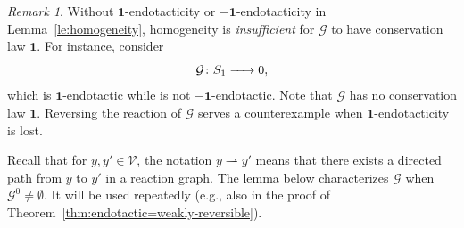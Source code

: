 \documentclass[10pt]{amsart}
\numberwithin{equation}{section}
\theoremstyle{plain}
\theoremstyle{definition}
\theoremstyle{remark}
\newtheorem{remark}[theorem]{Remark}
\newcommand{\cG}{\mathcal{G}}
\newcommand{\cV}{\mathcal{V}}
\begin{document}
\begin{remark}
 Without $\mathbf{1}$-endotacticity or $-\mathbf{1}$-endotacticity in Lemma~\ref{le:homogeneity}, homogeneity is \emph{insufficient} for $\cG$ to have conservation law $\mathbf{1}$. For instance, consider $$\cG\colon S_1\ce{->}0,$$ which is $\mathbf{1}$-endotactic while is not $-\mathbf{1}$-endotactic. Note that $\cG$ has no conservation law $\mathbf{1}$. Reversing the reaction of $\cG$ serves a counterexample when $\mathbf{1}$-endotacticity is lost.
\end{remark}



Recall that for $y,y'\in\cV$,  the notation  $y\rightharpoonup y'$ means that there exists a directed path from $y$ to $y'$ in a reaction graph. The lemma below characterizes $\cG$ when $\cG^0\neq\emptyset$. It will be used repeatedly (e.g., also in the proof of Theorem~\ref{thm:endotactic=weakly-reversible}).
\end{document}
